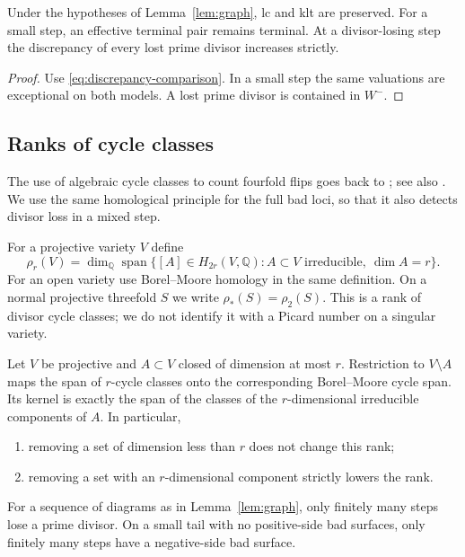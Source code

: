 \begin{corollary}\label{cor:singularities-preserved}
Under the hypotheses of Lemma~\ref{lem:graph}, lc and klt are preserved. For a small step, an effective terminal pair remains terminal. At a divisor-losing step the discrepancy of every lost prime divisor increases strictly.
\end{corollary}

\begin{proof}
Use \eqref{eq:discrepancy-comparison}. In a small step the same valuations are exceptional on both models. A lost prime divisor is contained in $W^-$.
\end{proof}

\subsection{Ranks of cycle classes}

The use of algebraic cycle classes to count fourfold flips goes back to
\cite{KMM87}; see also \cite[Lemma~10, preprint version]{FujinoCanonical}.
We use the same homological principle for the full bad loci, so that it
also detects divisor loss in a mixed step.

For a projective variety $V$ define
\[
 \rho_r(V)=
 \dim_{\mathbb Q}
 \operatorname{span}\{[A]\in H_{2r}(V,\mathbb Q):
                  A\subset V\text{ irreducible},\ \dim A=r\}.
\]
For an open variety use Borel--Moore homology in the same definition. On a normal projective threefold $S$ we write
$\rho_*(S)=\rho_2(S)$. This is a rank of divisor cycle classes; we do not identify it with a Picard number on a singular variety.

\begin{lemma}\label{lem:cycle-rank}
Let $V$ be projective and $A\subset V$ closed of dimension at most $r$. Restriction to $V\setminus A$ maps the span of $r$-cycle classes onto the corresponding Borel--Moore cycle span. Its kernel is exactly the span of the classes of the $r$-dimensional irreducible components of $A$. In particular,
\begin{enumerate}[label=\textup{(\roman*)}]
\item removing a set of dimension less than $r$ does not change this rank;
\item removing a set with an $r$-dimensional component strictly lowers the rank.
\end{enumerate}
For a sequence of diagrams as in Lemma~\ref{lem:graph}, only finitely many steps lose a prime divisor. On a small tail with no positive-side bad surfaces, only finitely many steps have a negative-side bad surface.
\end{lemma}

